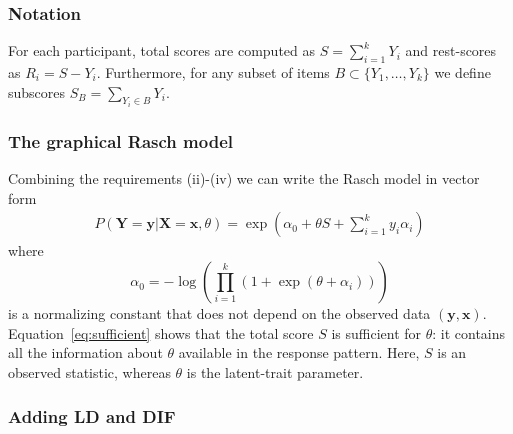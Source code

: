 \documentclass[12pt]{article}
\newcommand{\coauthortodo}[1]{%
  \marginnote{%
    \begin{tcolorbox}[
      width=\marginparwidth,
      colback=yellow!15!white, colframe=orange!70!black,
      colbacktitle=yellow!35!white, coltitle=black,
      title=TODO, fonttitle=\bfseries\scriptsize,
      toptitle=2pt, bottomtitle=2pt,
      fontupper=\scriptsize, boxrule=0.4pt, arc=1mm,
      boxsep=0pt, left=2pt, right=2pt, top=3pt, bottom=3pt,
      before skip=0pt, after skip=0pt
    ]
      \raggedright #1
    \end{tcolorbox}%
  }%
}
\theoremstyle{examplestyle}
\begin{document}
\subsubsection{Notation}

For each participant, total scores are computed as $S=\sum_{i=1}^k Y_i$ and rest-scores as $R_i=S-Y_i$. Furthermore, for any subset of items $B\subset\{Y_1,\dots,Y_k\}$ we define subscores $S_B=\sum_{Y_i\in B}Y_i$.

\subsubsection{The graphical Rasch model}

Combining the requirements (ii)-(iv) we can write the Rasch model in vector form
\begin{align}
P(\boldsymbol{Y} = \boldsymbol{y} | \boldsymbol{X} = \boldsymbol{x}, \theta) =\exp\left(\alpha_0+\theta S+\sum_{i=1}^k y_i\alpha_{i}\right) \label{eq:sufficient}
\end{align}
where
$$
\alpha_0=-\log\left(\prod_{i=1}^k\left(1+\exp(\theta+\alpha_i)\right)\right)
$$
is a normalizing constant that does not depend on the observed data $(\boldsymbol{y},\boldsymbol{x})$. Equation~\eqref{eq:sufficient} shows that the total score $S$ is sufficient for $\theta$: it contains all the information about $\theta$ available in the response pattern. Here, $S$ is an observed statistic, whereas $\theta$ is the latent-trait parameter.

\subsubsection{Adding LD and DIF}

\end{document}
